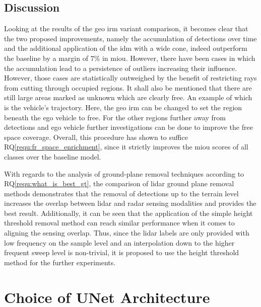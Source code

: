 \subsection{Discussion}
\label{subsec:discussion_gt}
Looking at the results of the geo \gls{irm} variant comparison, it becomes clear that the two proposed improvements, namely the accumulation of detections over time and the additional application of the \gls{idm} with a wide cone, indeed outperform the baseline by a margin of $7\%$ in m\gls{iou}. However, there have been cases in which the accumulation lead to a persistence of outliers increasing their influence. However, those cases are statistically outweighed by the benefit of restricting rays from cutting through occupied regions. It shall also be mentioned that there are still large areas marked as unknown which are clearly free. An example of which is the vehicle's trajectory. Here, the geo \gls{irm} can be changed to set the region beneath the ego vehicle to free. For the other regions further away from detections and ego vehicle further investigations can be done to improve the free space coverage. Overall, this procedure has shown to suffice RQ\ref{requ:fr_space_enrichment}, since it strictly improves the m\gls{iou} scores of all classes over the baseline model.

With regards to the analysis of ground-plane removal techniques according to RQ\ref{requ:what_is_best_gt}, the comparison of lidar ground plane removal methods demonstrates that the removal of detections up to the terrain level increases the overlap between lidar and radar sensing modalities and provides the best result. Additionally, it can be seen that the application of the simple height threshold removal method can reach similar performance when it comes to aligning the sensing overlap. Thus, since the lidar labels are only provided with low frequency on the sample level and an interpolation down to the higher frequent sweep level is non-trivial, it is proposed to use the height threshold method for the further experiments. 
%
\section{Choice of UNet Architecture}
\label{sec:choice_of_unet_arch}
%
